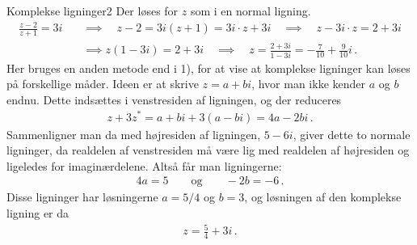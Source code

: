 \begin{opgave}{Komplekse ligninger}{2}
\opg Der løses for $z$ som i en normal ligning.
\begin{align*}
\frac{z-2}{z+1} = 3i \quad &\implies \quad z-2 = 3i\left(z+1\right) = 3i \cdot z + 3i \quad \implies \quad z - 3i \cdot z = 2 + 3i \\
&\implies z  \left(1-3i\right) = 2+3i \quad \implies \quad z = \frac{2+3i}{1-3i} = -\frac{7}{10} +  \frac{9}{10}i \, .
\end{align*}
\opg Her bruges en anden metode end i 1), for at vise at komplekse ligninger kan løses på forskellige måder. Ideen er at skrive $z=a+bi$, hvor man ikke kender $a$ og $b$ endnu. Dette indsættes i venstresiden af ligningen, og der reduceres
\begin{align*}
z + 3z^* = a+bi + 3(a-bi) = 4a -2bi \, .
\end{align*}
Sammenligner man da med højresiden af ligningen, $5-6i$, giver dette to normale ligninger, da realdelen af venstresiden må være lig med realdelen af højresiden og ligeledes for imaginærdelene. Altså får man ligningerne:
\begin{align*}
4a = 5 \qquad \text{og} \qquad -2b = -6 \, .
\end{align*}
Disse ligninger har løsningerne $a=5/4$ og $b=3$, og løsningen af den komplekse ligning er da
\begin{align*}
z = \frac{5}{4} + 3i \, .
\end{align*}
\end{opgave}

